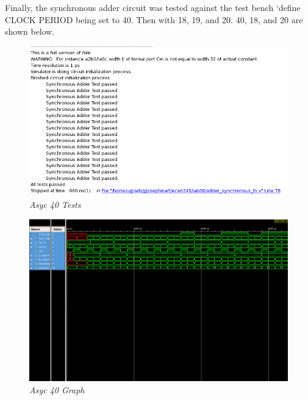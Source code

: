 \documentclass[a4paper,12pt]{article}
\begin{document}
  Finally, the synchronous adder circuit was tested against the test bench
  ‘define CLOCK PERIOD being set to 40. Then with 18, 19, and 20. 40, 18,
  and 20 are shown below.
  
  \begin{figure}[h]
    \begin{center}
      \includegraphics[scale=0.5]{asyc40_tests.png}
      \caption{\textit{Asyc 40 Tests}}
    \end{center}
  \end{figure}
  
  \newpage

  \begin{figure}[h]
    \begin{center}
      \includegraphics[scale=0.3]{asyc40_graph.png}
      \caption{\textit{Asyc 40 Graph}}
    \end{center}
  \end{figure}
  
\end{document}
